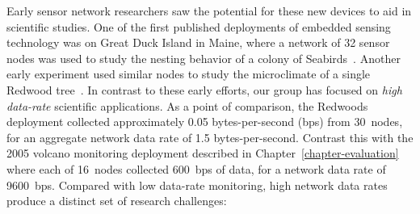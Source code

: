 Early sensor network researchers saw the potential for these new devices to
aid in scientific studies. One of the first published deployments of embedded
sensing technology was on Great Duck Island in Maine, where a network of 32
sensor nodes was used to study the nesting behavior of a colony of
Seabirds~\cite{gdi-sensys04}. Another early experiment used similar nodes to
study the microclimate of a single Redwood tree~\cite{berkeley-redwoods}.  In
contrast to these early efforts, our group has focused on \textit{high
data-rate} scientific applications. As a point of comparison, the Redwoods
deployment collected approximately 0.05 bytes-per-second (bps) from 30~nodes,
for an aggregate network data rate of 1.5 bytes-per-second. Contrast this
with the 2005 volcano monitoring deployment described in
Chapter~\ref{chapter-evaluation} where each of 16~nodes collected 600~bps of
data, for a network data rate of 9600~bps. Compared with low data-rate
monitoring, high network data rates produce a distinct set of research
challenges:

